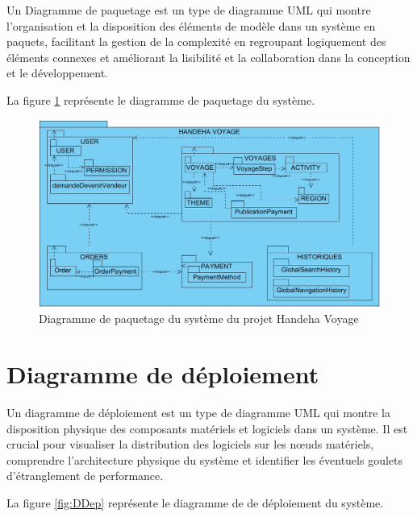\documentclass[12pt]{report}
\begin{document}
			\hspace{15pt} Un Diagramme de paquetage est un type de diagramme UML qui montre l'organisation et la disposition des éléments de modèle dans un système en paquets, facilitant la gestion de la complexité en regroupant logiquement des éléments connexes et améliorant la lisibilité et la collaboration dans la conception et le développement.

			La figure \ref{fig:DPaquetage} représente le diagramme de paquetage du système.

			\begin{figure}[h]
				\centering
				\includegraphics[width=\textwidth]{DPaquetage.jpg}
				\caption{Diagramme de paquetage du système du projet Handeha Voyage}
				\label{fig:DPaquetage}
			\end{figure}
			\clearpage


			\section{Diagramme de déploiement}
			
			\hspace{15pt} Un diagramme de déploiement est un type de diagramme UML qui montre la disposition physique des composants matériels et logiciels dans un système. Il est crucial pour visualiser la distribution des logiciels sur les nœuds matériels, comprendre l'architecture physique du système et identifier les éventuels goulets d'étranglement de performance.


			La figure \ref{fig:DDep} représente le diagramme de  de déploiement du système.
\end{document}
